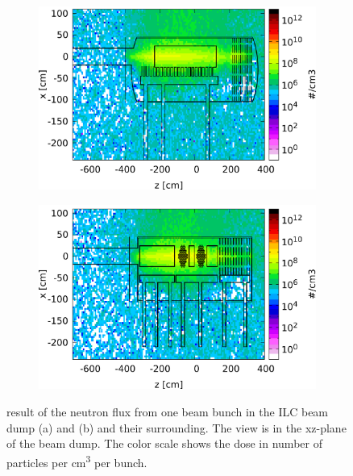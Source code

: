 \begin{figure}[!h]
 \centering
  \begin{subfigure}[b]{0.49\textwidth}
   \centering
    \includegraphics[width=\textwidth]{Figures/BeamDump/Neutron_flux_xz_Design1.png}
   \caption{\designone}
   \end{subfigure}
   \hfill
    \begin{subfigure}[b]{0.49\textwidth}
   \centering
    \includegraphics[width=\textwidth]{Figures/BeamDump/Neutron_flux_xz_Design2.png}
   \caption{\designtwo}
   \end{subfigure}
   \caption[Neutron flux in the ILC main beam dump]{\fluka result of the neutron flux from one beam bunch in the ILC beam dump \designone (a) and \designtwo (b) and their surrounding.
   The view is in the xz-plane of the beam dump.
   The color scale shows the dose in number of particles per \si{\centi\meter\cubed} per bunch.}
   \label{fig:BeamDumps:Neutrons}
\end{figure} 
